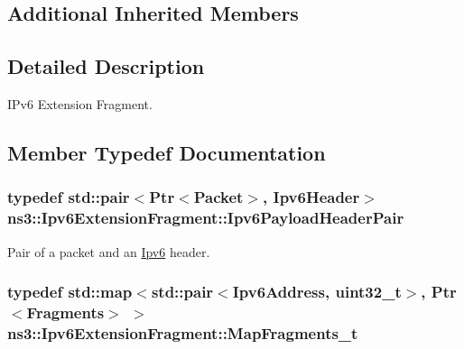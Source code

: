 \subsection*{Additional Inherited Members}


\subsection{Detailed Description}
I\+Pv6 Extension Fragment. 

\subsection{Member Typedef Documentation}
\subsubsection[{\texorpdfstring{Ipv6\+Payload\+Header\+Pair}{Ipv6PayloadHeaderPair}}]{\setlength{\rightskip}{0pt plus 5cm}typedef std\+::pair$<${\bf Ptr}$<${\bf Packet}$>$, {\bf Ipv6\+Header}$>$ {\bf ns3\+::\+Ipv6\+Extension\+Fragment\+::\+Ipv6\+Payload\+Header\+Pair}}\hypertarget{classns3_1_1Ipv6ExtensionFragment_a52bf3800a9db6fe2eb1a1c2b3a4414d8}{}\label{classns3_1_1Ipv6ExtensionFragment_a52bf3800a9db6fe2eb1a1c2b3a4414d8}


Pair of a packet and an \hyperlink{classns3_1_1Ipv6}{Ipv6} header. 

\subsubsection[{\texorpdfstring{Map\+Fragments\+\_\+t}{MapFragments_t}}]{\setlength{\rightskip}{0pt plus 5cm}typedef std\+::map$<$std\+::pair$<${\bf Ipv6\+Address}, uint32\+\_\+t$>$, {\bf Ptr}$<${\bf Fragments}$>$ $>$ {\bf ns3\+::\+Ipv6\+Extension\+Fragment\+::\+Map\+Fragments\+\_\+t}\hspace{0.3cm}{\ttfamily [private]}}\hypertarget{classns3_1_1Ipv6ExtensionFragment_a6d425bc0c4a0fe492883dfd93d73881d}{}\label{classns3_1_1Ipv6ExtensionFragment_a6d425bc0c4a0fe492883dfd93d73881d}


